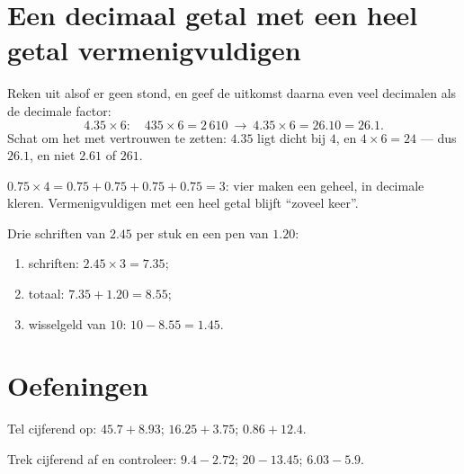 \section{Een decimaal getal met een heel getal vermenigvuldigen}

\begin{method}\label{met:g5:decimalops:mult}
Reken uit alsof er geen  stond, en geef de uitkomst daarna
even veel decimalen als de decimale factor:
\[
4.35 \times 6: \quad 435 \times 6 = 2\,610
\ \to\ 4.35 \times 6 = 26.10 = 26.1 .
\]
Schat om het  met vertrouwen te zetten: $4.35$ ligt dicht bij
$4$, en $4 \times 6 = 24$ --- dus $26.1$, en niet $2.61$ of $261$.
\end{method}

\begin{example}\label{ex:g5:decimalops:mult}
$0.75 \times 4 = 0.75 + 0.75 + 0.75 + 0.75 = 3$: vier  maken een
geheel, in decimale kleren. Vermenigvuldigen met een heel getal blijft
``zoveel keer''.
\end{example}

\begin{example}[Boodschappen]\label{ex:g5:decimalops:shopping}
Drie schriften van $2.45$ per stuk en een pen van $1.20$:
\begin{enumerate}
  \item schriften: $2.45 \times 3 = 7.35$;
  \item totaal: $7.35 + 1.20 = 8.55$;
  \item wisselgeld van $10$: $10 - 8.55 = 1.45$.
\end{enumerate}
\end{example}

\section{Oefeningen}

\begin{exercise}[$\star$]\label{exo:g5:decimalops:1}
Tel cijferend op: $45.7 + 8.93$; \quad $16.25 + 3.75$; \quad
$0.86 + 12.4$.
\end{exercise}

\begin{exercise}[$\star$]\label{exo:g5:decimalops:2}
Trek cijferend af en controleer: $9.4 - 2.72$; \quad $20 - 13.45$; \quad
$6.03 - 5.9$.
\end{exercise}

